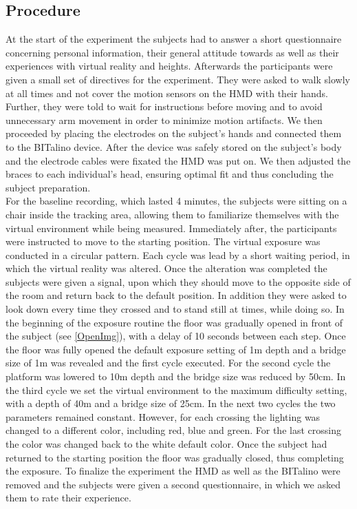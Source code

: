 \subsection{Procedure}
At the start of the experiment the subjects had to answer a short questionnaire concerning personal information, their general attitude towards as well as their experiences with virtual reality and heights. Afterwards the participants were given a small set of directives for the experiment. They were asked to walk slowly at all times and not cover the motion sensors on the HMD with their hands. Further, they were told to wait for instructions before moving and to avoid unnecessary arm movement in order to minimize motion artifacts. We then proceeded by placing the electrodes on the subject's hands and connected them to the BITalino device. After the device was safely stored on the subject's body and the electrode cables were fixated the HMD was put on. We then adjusted the braces to each individual's head, ensuring optimal fit and thus concluding the subject preparation.\\
For the baseline recording, which lasted 4 minutes, the subjects were sitting on a chair inside the tracking area, allowing them to familiarize themselves with the virtual environment while being measured. Immediately after, the participants were instructed to move to the starting position. The virtual exposure was conducted in a circular pattern. Each cycle was lead by a short waiting period, in which the virtual reality was altered. Once the alteration was completed the subjects were given a signal, upon which they should move to the opposite side of the room and return back to the default position. In addition they were asked to look down every time they crossed and to stand still at times, while doing so. In the beginning of the exposure routine the floor was gradually opened in front of the subject (see \ref{OpenImg}), with a delay of 10 seconds between each step. Once the floor was fully opened the default exposure setting of 1m depth and a bridge size of 1m was revealed and the first cycle executed. For the second cycle the platform was lowered to 10m depth and the bridge size was reduced by 50cm. In the third cycle we set the virtual environment to the maximum difficulty setting, with a depth of 40m and a bridge size of 25cm. In the next two cycles the two parameters remained constant. However, for each crossing the lighting was changed to a different color, including red, blue and green. For the last crossing the color was changed back to the white default color. Once the subject had returned to the starting position the floor was gradually closed, thus completing the exposure.
To finalize the experiment the HMD as well as the BITalino were removed and the subjects were given a second questionnaire, in which we asked them to rate their experience.\\


